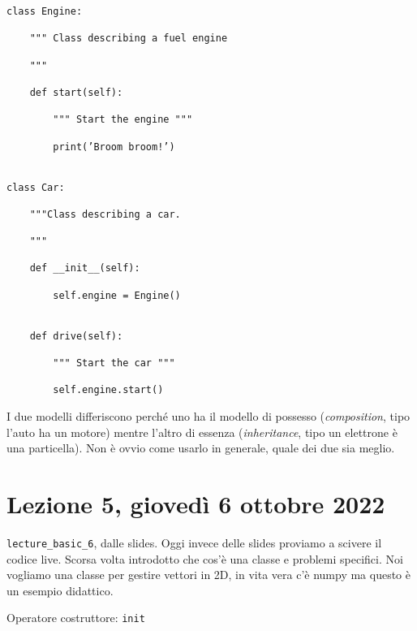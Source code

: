 \documentclass[10pt, a4paper, titlepage]{book}
\begin{document}
\begin{verbatim}
class Engine:

	""" Class describing a fuel engine

	"""

	def start(self):

		""" Start the engine """

		print(’Broom broom!’)


class Car:

	"""Class describing a car.

	"""

	def __init__(self):

		self.engine = Engine()

	
	def drive(self):

		""" Start the car """

		self.engine.start()
\end{verbatim}

I due modelli differiscono perché uno ha il modello di possesso (\textit{composition}, tipo l'auto ha un motore) mentre l'altro di essenza (\textit{inheritance}, tipo un elettrone è una particella). Non è ovvio come usarlo in generale, quale dei due sia meglio.


\section{Lezione 5, giovedì 6 ottobre 2022}

\texttt{lecture\_basic\_6}, dalle slides.
Oggi invece delle slides proviamo a scivere il codice live.
Scorsa volta introdotto che cos'è una classe e problemi specifici.
Noi vogliamo una classe per gestire vettori in 2D, in vita vera c'è numpy ma questo è un esempio didattico.

Operatore costruttore: \texttt{init} 
\end{document}
